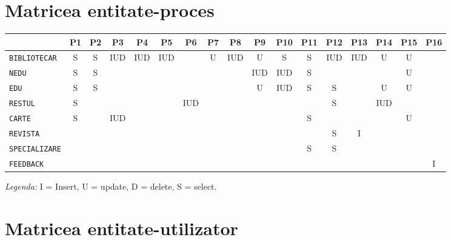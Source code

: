 

\section{Matricea entitate-proces}
\label{sec:matr-ep}

\begin{center}
  \footnotesize
  \begin{tabular}{|l|c|c|c|c|c|c|c|c|c|c|c|c|c|c|c|c|}
    \hline
    & P1 & P2 & P3 & P4 & P5 & P6 & P7 & P8 & P9 & P10 & P11 & P12 & P13 & P14 & P15 & P16 \\
    \hline \hline
    \texttt{BIBLIOTECAR} & S & S & IUD & IUD & IUD & & U & IUD & U & S & S & IUD & IUD & U & U & \\
    \hline
    \texttt{NEDU} & S & S & & & & & & & IUD & IUD & S & & & & U & \\
    \hline
    \texttt{EDU} & S & S & & & & & & & U & IUD & S & S & & U & U & \\
    \hline
    \texttt{RESTUL} & S & & & & & IUD & & & & & & S & & IUD & & \\
    \hline
    \texttt{CARTE} & S & & IUD & & & & & & & & S & & & & U & \\
    \hline
    \texttt{REVISTA} & & & & & & & & & & & & S & I & & & \\
    \hline
    \texttt{SPECIALIZARE} & & & & & & & & & & & S & S & & & & \\
    \hline
    \texttt{FEEDBACK} & & & & & & & & & & & & & & & & I \\
    \hline
  \end{tabular}
\end{center}

\emph{Legenda:} I = Insert, U = update, D = delete, S = select.


\section{Matricea entitate-utilizator}
\label{sec:matr-eu}

